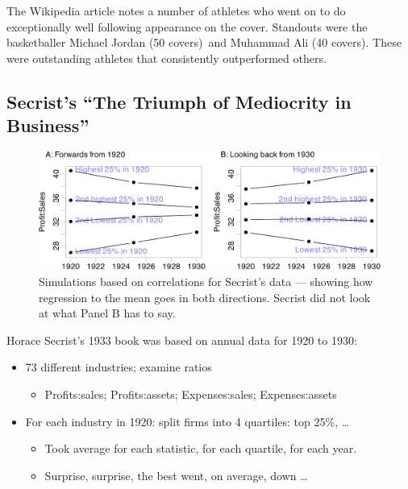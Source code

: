 \documentclass[
  10pt,
  b5paper]{book}
\providecommand{\tightlist}{%
  \setlength{\itemsep}{0pt}\setlength{\parskip}{0pt}}
\begin{document}
The Wikipedia article notes a number of athletes who went on to do
exceptionally well following appearance on the cover. Standouts
were the basketballer Michael Jordan (50 covers)~and Muhammad Ali
(40 covers). These were outstanding athletes that consistently
outperformed others.

\hypertarget{secrists-the-triumph-of-mediocrity-in-business}{%
\subsection*{Secrist's ``The Triumph of Mediocrity in Business''}\label{secrists-the-triumph-of-mediocrity-in-business}}

\begin{figure}[H]

{\centering \includegraphics[width=1.05\linewidth]{07-regress_files/figure-latex/sim-1} 

}

\caption{Simulations based on correlations for Secrist's data --- 
               showing how regression to the mean goes in both directions.
               Secrist did not look at what Panel B has to say.}\label{fig:sim}
\end{figure}

Horace Secrist's 1933 book was based on annual data for 1920 to 1930:

\begin{itemize}
\tightlist
\item
  73 different industries; examine ratios

  \begin{itemize}
  \tightlist
  \item
    Profits:sales; Profits:assets; Expenses:sales; Expenses:assets
  \end{itemize}
\item
  For each industry in 1920: split firms into 4 quartiles: top 25\%, \ldots{}

  \begin{itemize}
  \tightlist
  \item
    Took average for each statistic, for each quartile, for each year.
  \item
    Surprise, surprise, the best went, on average, down \ldots{}
  \end{itemize}
\end{itemize}
\end{document}
